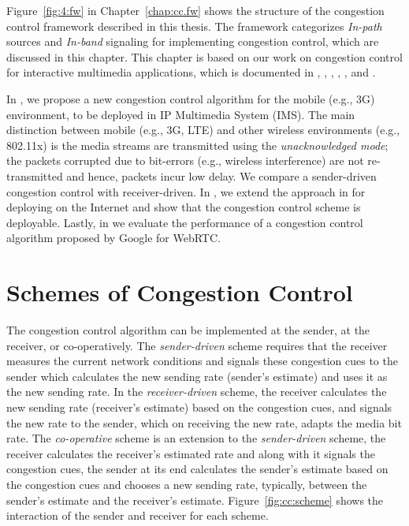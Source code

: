 Figure~\ref{fig:4:fw} in Chapter~\ref{chap:cc.fw} shows the structure of the
congestion control framework described in this thesis. The framework
categorizes \emph{In-path} sources and \emph{In-band} signaling for
implementing congestion control, which are discussed in this chapter. This
chapter is based on our work on congestion control for interactive multimedia
applications, which is documented in , ,
, \cite{draft.xr.discard.rle},
\cite{draft.xr.bytes.discarded}, \cite{singh:2010:thesis} and
\cite{Singh:control.loops.api}.

In , we propose a new congestion control algorithm for the
mobile (e.g., 3G) environment, to be deployed in IP Multimedia System (IMS).
The main distinction between mobile (e.g., 3G, LTE) and other wireless
environments (e.g., 802.11x) is the media streams are transmitted using the
\emph{unacknowledged mode}; the packets corrupted due to bit-errors (e.g.,
wireless interference) are not re-transmitted and hence, packets incur low
delay. We compare a sender-driven congestion control with receiver-driven. In
, we extend the approach in  for deploying on
the Internet and show that the congestion control scheme is deployable.
Lastly, in  we evaluate the performance of a congestion
control algorithm proposed by Google for WebRTC.

\section{Schemes of Congestion Control}

The congestion control algorithm can be implemented at the sender, at the
receiver, or co-operatively. The \emph{sender-driven} scheme requires that the
receiver measures the current network conditions and signals these congestion
cues to the sender which calculates the new sending rate (sender's estimate)
and uses it as the new sending rate. In the \emph{receiver-driven} scheme, the
receiver calculates the new sending rate (receiver's estimate) based on the
congestion cues, and signals the new rate to the sender, which on receiving
the new rate, adapts the media bit rate. The \emph{co-operative} scheme is an
extension to the \emph{sender-driven} scheme, the receiver calculates the
receiver's estimated rate and along with it signals the congestion cues, the
sender at its end calculates the sender's estimate based on the congestion
cues and chooses a new sending rate, typically, between the sender's estimate
and the receiver's estimate. Figure~\ref{fig:cc:scheme} shows the interaction
of the sender and receiver for each scheme.

